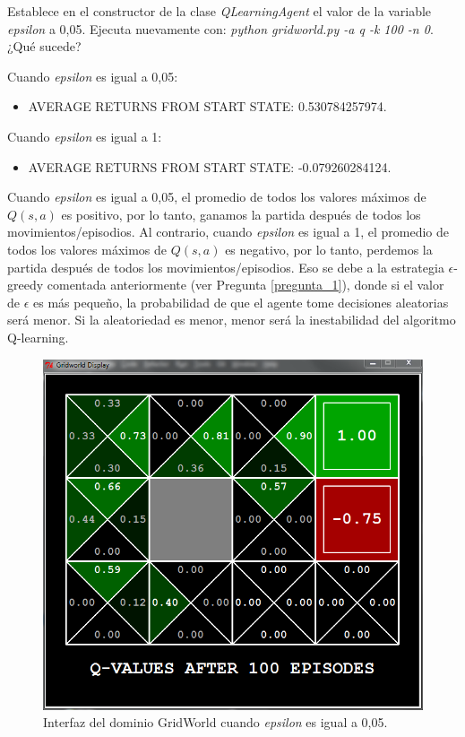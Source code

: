 \documentclass[11pt]{exam}
\begin{document}
\begin{questions}
{ \question Establece en el constructor de la clase \textit{QLearningAgent} el valor de la variable \textit{epsilon} a 0,05. Ejecuta nuevamente con: \textit{python gridworld.py -a q -k 100 -n 0}. ¿Qué sucede?
}

Cuando \textit{epsilon} es igual a 0,05:
\begin{itemize}
	\item AVERAGE RETURNS FROM START STATE: 0.530784257974.
\end{itemize}

Cuando \textit{epsilon} es igual a 1:
\begin{itemize}
	\item AVERAGE RETURNS FROM START STATE: -0.079260284124.
\end{itemize}

Cuando \textit{epsilon} es igual a 0,05, el promedio de todos los valores máximos de $Q(s,a)$ es positivo, por lo tanto, ganamos la partida después de todos los movimientos/episodios. Al contrario, cuando \textit{epsilon} es igual a 1, el promedio de todos los valores máximos de $Q(s,a)$ es negativo, por lo tanto, perdemos la partida después de todos los movimientos/episodios. Eso se debe a la estrategia $\epsilon$-greedy comentada anteriormente (ver Pregunta \ref{pregunta_1}), donde si el valor de $\epsilon$ es más pequeño, la probabilidad de que el agente tome decisiones aleatorias será menor. Si la aleatoriedad es menor, menor será la inestabilidad del algoritmo Q-learning.

\begin{figure}[h]
	\centering
	\includegraphics[scale=0.5]{image_4}
	\caption{Interfaz del dominio GridWorld cuando \textit{epsilon} es igual a 0,05.}
	\label{image_4}
\end{figure}


\end{questions}
\end{document}
